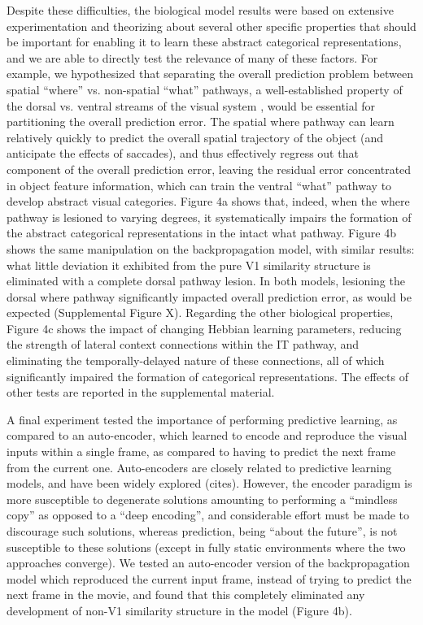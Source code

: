 \documentclass[11pt,twoside]{article}
\newif\myifpdf
\begin{document}
Despite these difficulties, the biological model results were based on extensive experimentation and theorizing about several other specific properties that should be important for enabling it to learn these abstract categorical representations, and we are able to directly test the relevance of many of these factors.  For example, we hypothesized that separating the overall prediction problem between spatial ``where'' vs. non-spatial ``what'' pathways, a well-established property of the dorsal vs. ventral streams of the visual system \cite{UngerleiderMishkin82}, would be essential for partitioning the overall prediction error.  The spatial where pathway can learn relatively quickly to predict the overall spatial trajectory of the object (and anticipate the effects of saccades), and thus effectively regress out that component of the overall prediction error, leaving the residual error concentrated in object feature information, which can train the ventral “what” pathway to develop abstract visual categories.  Figure 4a shows that, indeed, when the where pathway is lesioned to varying degrees, it systematically impairs the formation of the abstract categorical representations in the intact what pathway.  Figure 4b shows the same manipulation on the backpropagation model, with similar results: what little deviation it exhibited from the pure V1 similarity structure is eliminated with a complete dorsal pathway lesion.  In both models, lesioning the dorsal where pathway significantly impacted overall prediction error, as would be expected (Supplemental Figure X).  Regarding the other biological properties, Figure 4c shows the impact of changing Hebbian learning parameters, reducing the strength of lateral context connections within the IT pathway, and eliminating the temporally-delayed nature of these connections, all of which significantly impaired the formation of categorical representations.  The effects of other tests are reported in the supplemental material.

A final experiment tested the importance of performing predictive learning, as compared to an auto-encoder, which learned to encode and reproduce the visual inputs within a single frame, as compared to having to predict the next frame from the current one.  Auto-encoders are closely related to predictive learning models, and have been widely explored (cites).  However, the encoder paradigm is more susceptible to degenerate solutions amounting to performing a “mindless copy” as opposed to a “deep encoding”, and considerable effort must be made to discourage such solutions, whereas prediction, being “about the future”, is not susceptible to these solutions (except in fully static environments where the two approaches converge).  We tested an auto-encoder version of the backpropagation model which reproduced the current input frame, instead of trying to predict the next frame in the movie, and found that this completely eliminated any development of non-V1 similarity structure in the model (Figure 4b).
\end{document}
